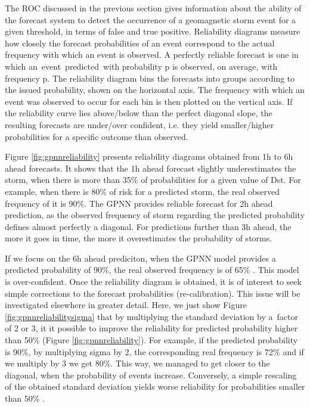 The ROC discussed in the previous section gives information about the ability of the forecast system to 
detect the occurrence of a geomagnetic storm event for a given threshold, in terms of false and true positive. 
Reliability diagrams measure how closely the forecast probabilities of an event correspond to the actual 
frequency with which an event is observed. A perfectly reliable forecast is one in which an\ event\ predicted\ 
with probability p is observed, on average, with frequency p. The reliability diagram bins the forecasts into 
groups according to the issued probability, shown on the horizontal axis. The frequency with which an event was 
observed to occur for each bin is then plotted on the vertical axis.  If the reliability curve lies above/below 
than the perfect diagonal slope, the resulting forecasts  are under/over confident, i.e. they yield  
smaller/higher probabilities for a specific outcome than observed. 


Figure \ref{fig:gpnnreliability} presents reliability diagrams obtained from 1h to 6h ahead forecasts. 
It shows that the 1h ahead forecast slightly underestimates the storm, when there is more than 35$\%$  of 
probabilities for a given value of Dst. For example, when there is 80$\%$  of risk for a predicted storm, 
the real observed frequency of it is 90$\%$. The GPNN provides reliable forecast for 2h ahead prediction, 
as the observed frequency of storm regarding the predicted probability defines almost perfectly a diagonal. 
For predictions further than 3h ahead, the more it goes in time, the more it overestimates the probability of storms. 

If we focus on the 6h ahead prediciton, when the GPNN model provides a predicted probability of 90$\%$, the 
real observed frequency is of 65$\%$ . This model is over-confident. Once the reliability diagram is obtained, 
it is of interest to seek simple corrections to the forecast probabilities (re-calibration). This issue will be 
investigated elsewhere in greater detail. Here, we just show Figure \ref{fig:gpnnreliabilitysigma} that by multiplying 
the standard deviation by a\ factor of 2 or 3, it it possible to improve the reliability for predicted probability 
higher than 50$\%$ (Figure \ref{fig:gpnnreliability}). For example, if the predicted probability is 90$\%$, 
by multiplying sigma by 2, the corresponding real frequency is 72$\%$ and if we multiply by 3 we get 80$\%$. 
This way, we managed to get closer to the diagonal, when the probability of events increase. Conversely, 
a simple rescaling of the obtained standard deviation yields worse reliability for probabilities smaller than 50$\%$ .  


